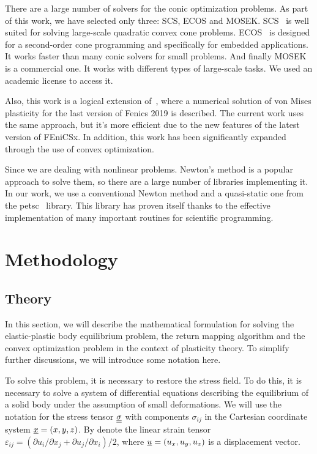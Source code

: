\documentclass[12pt]{article}
\begin{document}
There are a large number of solvers for the conic optimization problems. As part of this work, we have selected only three: SCS, ECOS and MOSEK. SCS~\parencite{ocpb:16} is well suited for solving large-scale quadratic convex cone problems. ECOS~\parencite{Domahidi2013ecos} is designed for a second-order cone programming and specifically for embedded applications. It works faster than many conic solvers for small problems. And finally MOSEK~\parencite{mosek} is a commercial one. It works with different types of large-scale tasks. We used an academic license to access it.

Also, this work is a logical extension of~\parencite{bleyer2018numericaltours}, where a numerical solution of von Mises plasticity for the last version of Fenics 2019 is described. The current work uses the same approach, but it's more efficient due to the new features of the latest version of FEniCSx. In addition, this work has been significantly expanded through the use of convex optimization.

Since we are dealing with nonlinear problems. Newton's method is a popular approach to solve them, so there are a large number of libraries implementing it. In our work, we use a conventional Newton method and a quasi-static one from the petsc~\parencite{petsc-user-ref} library. This library has proven itself thanks to the effective implementation of many important routines for scientific programming. 

\newpage
\section{Methodology}

\subsection{Theory}

In this section, we will describe the mathematical formulation for solving the elastic-plastic body equilibrium problem, the return mapping algorithm and the convex optimization problem in the context of plasticity theory. To simplify further discussions, we will introduce some notation here. 

To solve this problem, it is necessary to restore the stress field. To do this, it is necessary to solve a system of differential equations describing the equilibrium of a solid body under the assumption of small deformations. We will use the notation for the stress tensor $\underline{\underline{\sigma}}$ with components $\sigma_{ij}$ in the Cartesian coordinate system $\underline{x} = (x, y, z)$. By denote the linear strain tensor $\varepsilon_{ij}=(\partial u_i/\partial x_j+\partial u_j/\partial x_i)/2$, where $\underline{u}=(u_x, u_y, u_z)$ is a displacement vector.
\end{document}
